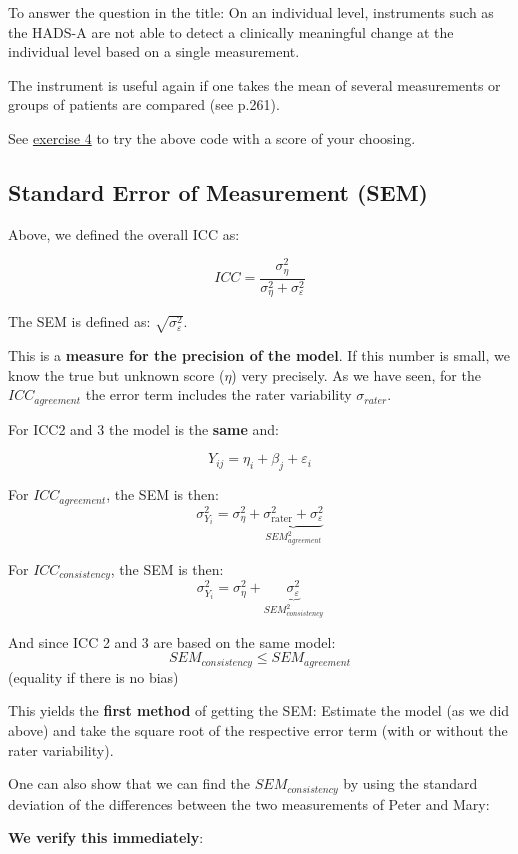 \documentclass[
]{book}
\begin{document}
To answer the question in the title: On an individual level, instruments such as the HADS-A
are not able to detect a clinically meaningful change at the individual level based on a single measurement.

The instrument is useful again if one takes the mean of several measurements or groups of
patients are compared (see p.261).

See \hyperref[exercise4]{exercise 4} to try the above code with a score of your choosing.

\subsection{Standard Error of Measurement (SEM)}\label{standard-error-of-measurement-sem}

Above, we defined the overall ICC as:

\[ICC = \frac{\sigma_{\eta}^2}{\sigma_{\eta}^2 + \sigma_{\varepsilon}^2}\]

The SEM is defined as: \(\sqrt{\sigma_{\varepsilon}^2}\).

This is a \textbf{measure for the precision of the model}. If this number is small,
we know the true but unknown score (\(\eta\)) very precisely. As we have seen, for the
\(ICC_{agreement}\) the error term includes the rater variability \(\sigma_{rater}\).

For ICC2 and 3 the model is the \textbf{same} and:

\[Y_{ij} = \eta_i + \beta_j + \varepsilon_i\]

For \(ICC_{agreement}\), the SEM is then:
\[\sigma_{Y_i}^2 = \sigma_{\eta}^2 + \underbrace{\sigma_{\text{rater}}^2 + \sigma_{\varepsilon}^2}_{SEM_{agreement}^2}\]

For \(ICC_{consistency}\), the SEM is then:
\[\sigma_{Y_i}^2 = \sigma_{\eta}^2 + \underbrace{\sigma_{\varepsilon}^2}_{SEM_{consistency}^2}\]

And since ICC 2 and 3 are based on the same model:
\[SEM_{consistency} \le SEM_{agreement}\]
(equality if there is no bias)

This yields the \textbf{first method} of getting the SEM: Estimate the
model (as we did above) and take the square root of the respective error term
(with or without the rater variability).

One can also show that we can find the \(SEM_{consistency}\) by using
the standard deviation of the differences between the two measurements
of Peter and Mary:

\textbf{We verify this immediately}:
\end{document}
